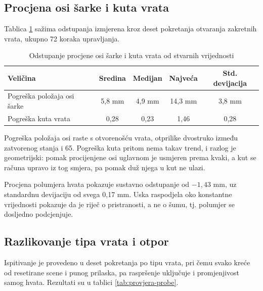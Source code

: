 \subsection{Procjena osi šarke i kuta vrata}

Tablica \ref{tab:provjera-os} sažima odstupanja izmjerena kroz deset pokretanja otvaranja
zakretnih vrata, ukupno 72 koraka upravljanja.

\begin{table}[H]
    \centering
    \caption{Odstupanje procjene osi šarke i kuta vrata od stvarnih vrijednosti}
    \label{tab:provjera-os}
    \begin{tabular}{@{}lcccc@{}}
        \toprule
        Veličina                    & Sredina           & Medijan           & Najveća           & Std. devijacija   \\
        \midrule
        Pogreška položaja osi šarke & 5,8 mm            & 4,9 mm            & 14,3 mm           & 3,8 mm            \\
        Pogreška kuta vrata         & 0,28\textdegree{} & 0,23\textdegree{} & 1,46\textdegree{} & 0,28\textdegree{} \\
        \bottomrule
    \end{tabular}
\end{table}

Pogreška položaja osi raste s otvorenošću vrata, otprilike dvostruko između zatvorenog stanja i
65\textdegree{}. Pogreška kuta pritom nema takav trend, i razlog je geometrijski: pomak
procijenjene osi uglavnom je usmjeren prema kvaki, a kut se računa upravo iz tog smjera, pa
pomak duž njega u kut ne ulazi.

Procjena polumjera hvata pokazuje sustavno odstupanje od $-1{,}43$ mm, uz standardnu devijaciju od
svega 0,17 mm. Uska raspodjela oko konstantne vrijednosti pokazuje da je riječ o pristranosti, a ne
o šumu, tj. polumjer se dosljedno podcjenjuje.

\subsection{Razlikovanje tipa vrata i otpor}

Ispitivanje je provedeno u deset pokretanja po tipu vrata, pri čemu svako kreće od resetirane
scene i punog prilaska, pa raspršenje uključuje i promjenjivost samog hvata. Rezultati su u
tablici \ref{tab:provjera-probe}.

